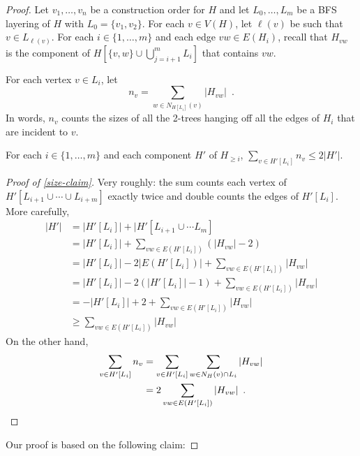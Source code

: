 \documentclass[kpfonts]{patmorin}
\begin{document}
\begin{proof}
    Let $v_1,\ldots,v_n$ be a construction order for $H$ and
    let $L_0,\ldots,L_m$ be a BFS layering of $H$ with $L_0=\{v_1,v_2\}$.  For each $v\in V(H)$, let $\ell(v)$ be such that $v\in L_{\ell(v)}$.  For each $i\in\{1,\ldots,m\}$ and each edge $vw\in E(H_i)$, recall that $H_{vw}$ is the component of $H[\{v,w\}\cup\bigcup_{j=i+1}^m L_i]$ that contains $vw$.

    For each vertex $v\in L_i$, let
    \begin{equation}
        n_v=\sum_{w\in N_{H[L_i]}(v)}|H_{vw}| \enspace . \label{nv}
    \end{equation}
    In words, $n_v$ counts the sizes of all the 2-trees hanging off all the edges of $H_i$ that are incident to $v$.

    \begin{clm}\label{size-claim}
        For each $i\in\{1,\ldots,m\}$ and each component $H'$ of $H_{\ge i}$, $\sum_{v\in H'[L_i]} n_v \le 2|H'|$.
    \end{clm}

    \begin{proof}[Proof of \cref{size-claim}]
        Very roughly: the sum counts each vertex of $H'[L_{i+1}\cup\cdots\cup L_{i+m}]$ exactly twice and double counts the edges of $H'[L_i]$.
        More carefully,
        \begin{align*} |H'|
            & = |H'[L_{i}]| + |H'[L_{i+1}\cup\cdots L_{m}] \\
            & = |H'[L_i]|+\sum_{vw\in E(H'[L_i])} (|H_{vw}|-2) \\
            & = |H'[L_i]|-2|E(H'[L_i])| + \sum_{vw\in E(H'[L_i])} |H_{vw}| \\
            & = |H'[L_i]|-2(|H'[L_i]|-1) + \sum_{vw\in E(H'[L_i])} |H_{vw}| \\
            & = -|H'[L_i]|+2 + \sum_{vw\in E(H'[L_i])} |H_{vw}| \\
            & \ge \sum_{vw\in E(H'[L_i])} |H_{vw}|
        \end{align*}
        On the other hand,
        \begin{align*}
            \sum_{v\in H'[L_i]} n_v
            & = \sum_{v\in H'[L_i]}\sum_{w\in N_H(v)\cap L_i}|H_{vw}| \\
            & = 2 \sum_{vw\in E(H'[L_i])} |H_{vw}| \enspace . \qedhere
        \end{align*}
    \end{proof}

Our proof is based on the following claim:


\end{proof}
\end{document}
